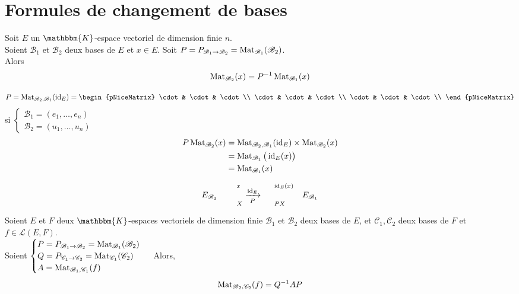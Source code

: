 \part{Formules de changement de bases}

\begin{prop}
	Soit $E$ un $\mathbbm{K}$-espace vectoriel de dimension finie $n$.\\
	Soient $\mathcal{B}_1$ et $\mathcal{B}_2$ deux bases de $E$ et $x \in E$. Soit $P = P_{\mathcal{B}_1 \to \mathcal{B}_2} = \operatorname{Mat}_{\mathcal{B}_1}(\mathcal{B}_2)$.\\
	Alors \[
		\operatorname{Mat}_{\mathcal{B}_2}(x) = P^{-1} \operatorname{Mat}_{\mathcal{B}_1}(x)
	\]
\end{prop}

\begin{prv}
	\[
		P = \Mat_{\mathcal{B}_2, \mathcal{B}_1}(\id_E) = \begin{pNiceMatrix}
			\cdot & \cdot & \cdot \\
			\cdot & \cdot & \cdot \\
			\cdot & \cdot & \cdot \\
		\end{pNiceMatrix}  %
	\] si $\begin{cases}
		 \mathcal{B}_1 = (e_1, \ldots, e_n)\\
		 \mathcal{B}_2 = (u_1, \ldots, u_n)
	\end{cases}$\\
	\begin{align*}
		P \operatorname{Mat}_{\mathcal{B}_2}(x) &= \operatorname{Mat}_{\mathcal{B}_2, \mathcal{B}_1}(\operatorname{id}_E) \times \operatorname{Mat}_{\mathcal{B}_2}(x) \\
		&= \operatorname{Mat}_{\mathcal{B}_1}\big(\operatorname{id}_E(x)\big) \\
		&= \operatorname{Mat}_{\mathcal{B}_1}(x) \\
	\end{align*}

	\[
		E_{\mathcal{B}_2} \quad {\begin{array}{c}
			~\\
			~
		\end{array}}^x_X \xrightarrow[P]{\operatorname{id}_E} {\begin{array}{c}
			~\\
			~
		\end{array}}^{\operatorname{id}_E(x)}_{PX} \quad E_{\mathcal{B}_1}
	\] %
\end{prv}

\begin{prop}
	Soient $E$ et $F$ deux $\mathbbm{K}$-espaces vectoriels de dimension finie $\mathcal{B}_1$ et $\mathcal{B}_2$ deux bases de $E$, et $\mathcal{C}_1, \mathcal{C}_2$ deux bases de $F$ et $f \in \mathcal{L}(E,F)$.\\
	Soient $\begin{cases}
		P = P_{\mathcal{B}_1 \to \mathcal{B}_2} = \operatorname{Mat}_{\mathcal{B}_1}(\mathcal{B}_2)\\
		Q = P_{\mathcal{C}_1\to \mathcal{C}_2} = \operatorname{Mat}_{\mathcal{C}_1}(\mathcal{C}_{2})\\
		A = \operatorname{Mat}_{\mathcal{B}_1, \mathcal{C}_1}(f)
	\end{cases}$\
	Alors, \[
		\operatorname{Mat}_{\mathcal{B}_2,\mathcal{C}_2}(f) = Q^{-1} A P
	\]
\end{prop}

